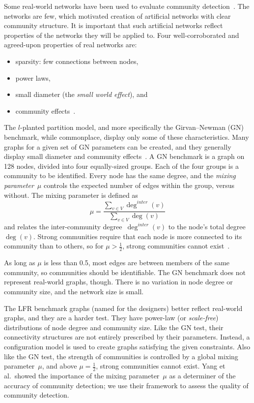 Some real-world networks have been used to evaluate community detection~\cite{krebs2002mapping, padgett1993robust, zachary1977information, lusseau2003bottlenose}. The networks are few, which motivated creation of artificial networks with clear community structure. It is important that such artificial networks reflect properties of the networks they will be applied to. Four well-corroborated and agreed-upon properties of real networks are:
\begin{itemize}

\item sparsity: few connections between nodes,
\item power laws, 
\item small diameter (the \emph{small world effect}), and 
\item community effects~\cite{chakrabarti2006graph, barabasi2016network, chung2010graph, kolaczyk2014statistical}.
\end{itemize}

The $l$-planted partition model, and more specifically the Girvan--Newman (GN) benchmark, while commonplace, display only some of these characteristics. Many graphs for a given set of GN parameters can be created, and they generally display small diameter and community effects~\cite{condon2001algorithms, girvan2002community}. A GN benchmark is a graph on 128 nodes, divided into four equally-sized groups. Each of the four groups is a community to be identified. Every node has the same degree, and the \emph{mixing parameter}~$\mu$ controls the expected number of edges within the group, versus without. The mixing parameter is defined as
\begin{equation}  
\mu = \frac
{\sum_{v \in V}\deg^{inter}(v)}
{\sum_{v \in V}\deg(v)}
\end{equation}
and relates the inter-community degree~$\deg^{inter}(v)$ to the node's total degree~$\deg(v)$. Strong communities require that each node is more connected to its community than to others, so for $\mu > \frac{1}{2}$, strong communities cannot exist~\cite{yang2016comparative}.

As long as $\mu$ is less than 0.5, most edges are between members of the same community, so communities should be identifiable. The GN benchmark does not represent real-world graphs, though. There is no variation in node degree or community size, and the network size is small.

The LFR benchmark graphs (named for the designers) better reflect real-world graphs, and they are a harder test. They have power-law (or \emph{scale-free}) distributions of node degree and community size. Like the GN test, their connectivity structures are not entirely prescribed by their parameters. Instead, a configuration model is used to create graphs satisfying the given constraints. Also like the GN test, the strength of communities is controlled by a global mixing parameter~$\mu$, and above $\mu = \frac{1}{2}$, strong communities cannot exist. Yang et al.\ showed the importance of the mixing parameter~$\mu$ as a determiner of the accuracy of community detection; we use their framework to assess the quality of community detection.



